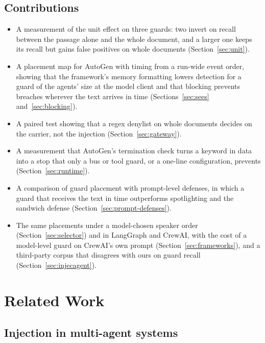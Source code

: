 \documentclass[conference]{IEEEtran}
\begin{document}
\subsection{Contributions}

\begin{itemize}
\item A measurement of the unit effect on three guards: two invert on recall
  between the passage alone and the whole document, and a larger one keeps
  its recall but gains false positives on whole documents
  (Section~\ref{sec:unit}).
\item A placement map for AutoGen with timing from a run-wide event order,
  showing that the framework's memory formatting lowers detection for a
  guard of the agents' size at the model client and that blocking prevents
  breaches wherever the text arrives in time (Sections~\ref{sec:sees} and~\ref{sec:blocking}).
\item A paired test showing that a regex denylist on whole documents decides
  on the carrier, not the injection (Section~\ref{sec:gateway}).
\item A measurement that AutoGen's termination check turns a keyword in data
  into a stop that only a bus or tool guard, or a one-line configuration,
  prevents (Section~\ref{sec:runtime}).
\item A comparison of guard placement with prompt-level defenses, in which a
  guard that receives the text in time outperforms spotlighting and the
  sandwich defense (Section~\ref{sec:prompt-defenses}).
\item The same placements under a model-chosen speaker order
  (Section~\ref{sec:selector}) and in LangGraph and CrewAI, with the cost of
  a model-level guard on CrewAI's own prompt (Section~\ref{sec:frameworks}),
  and a third-party corpus that disagrees with ours on guard recall
  (Section~\ref{sec:injecagent}).
\end{itemize}


\section{Related Work}
\label{sec:related}

\subsection{Injection in multi-agent systems}
\end{document}
